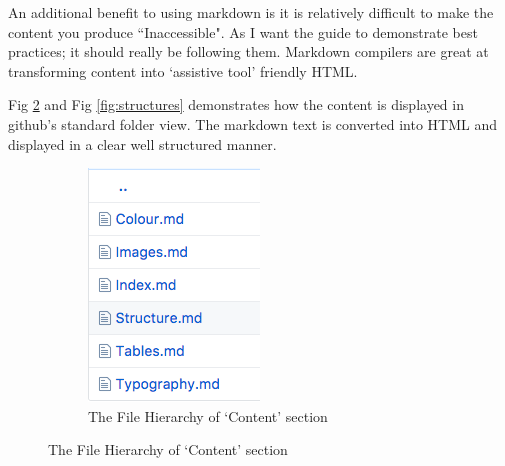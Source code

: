 An additional benefit to using markdown is it is relatively difficult to make
the content you produce ``Inaccessible". As I want the guide to demonstrate
best practices; it should really be following them. Markdown compilers are
great at transforming content into `assistive tool' friendly HTML.

Fig \ref{fig:hierarchy} and Fig \ref{fig:structures} demonstrates how the
content is displayed in github's standard folder view. The markdown text is
converted into HTML and displayed in a clear well structured manner.

\begin{figure}[H]
    \centering
    \begin{subfigure}[b]{0.25\textwidth}
        \includegraphics[width=\textwidth]{figures/documentation_md_example_1}
        \captionsetup{justification=centering}
        \caption{The File Hierarchy of `Content' section}
        \label{fig:hierarchy}
    \end{subfigure}

\end{figure}
